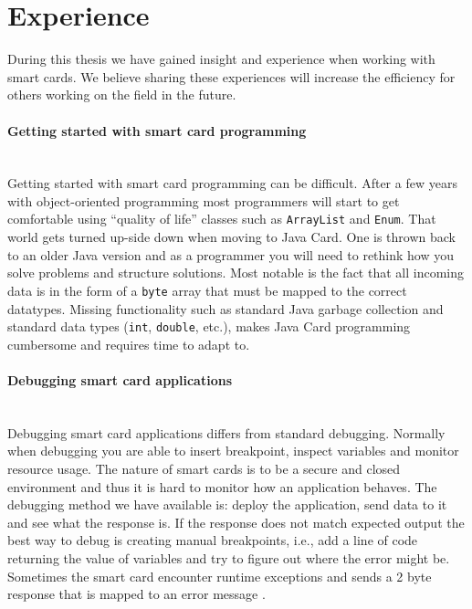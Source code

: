 \section{Experience}
During this thesis we have gained insight and experience when working with smart cards. We believe sharing these experiences will increase the efficiency for others working on the field in the future.

\paragraph{Getting started with smart card programming}\mbox{}\\
Getting started with smart card programming can be difficult. After a few years with object-oriented programming most programmers will start to get comfortable using ``quality of life'' classes such as \texttt{ArrayList} and \texttt{Enum}. That world gets turned up-side down when moving to Java Card. One is  thrown back to an older Java version and as a programmer you will need to rethink how you solve problems and structure solutions. Most notable is the fact that all incoming data is in the form of a \texttt{byte} array that must be mapped to the correct datatypes. Missing functionality such as standard Java garbage collection and standard data types (\texttt{int}, \texttt{double}, etc.), makes Java Card programming cumbersome and requires time to adapt to.

\paragraph{Debugging smart card applications}\mbox{}\\
Debugging smart card applications differs from standard debugging. Normally when debugging you are able to insert breakpoint, inspect variables and monitor resource usage. The nature of smart cards is to be a secure and closed environment and thus it is hard to monitor how an application behaves. The debugging method we have available is: deploy the application, send data to it and see what the response is. If the response does not match expected output the best way to debug is creating manual breakpoints, i.e., add a line of code returning the value of variables and try to figure out where the error might be. Sometimes the smart card encounter runtime exceptions and sends a 2 byte response that is mapped to an error message \cite{javacardErrors}.

